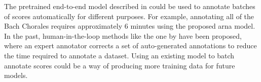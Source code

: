 
The pretrained end-to-end model described in
 could be used to annotate
batches of scores automatically for different purposes. For
example, annotating all of the Bach
Chorales
requires approximately 6 minutes using the proposed
\gls{arna} model. In the past, human-in-the-loop methods
like the one by \textcite{ju2019interactive} have been
proposed, where an expert annotator corrects a set of
auto-generated annotations to reduce the time required to
annotate a dataset. Using an existing model to batch
annotate scores could be a way of producing more training
data for future models.
